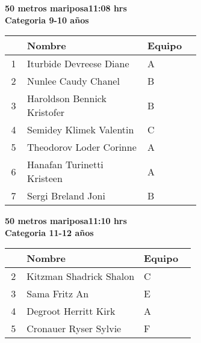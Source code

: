 \begin{minipage}{0.95\linewidth}\vspace{0.5cm} 
\begin{flushleft}
\textbf{
\hspace{-0.15cm}50 metros mariposa\hspace{1.5cm}11:08 hrs \\Categoria 9-10 años}\vspace{-0.2cm} 
\end{flushleft}
\begin{tabular}{cp{0.63\linewidth}l}
\hline
& \textbf{Nombre} & \textbf{Equipo} \\ \hline
1 & Iturbide Devreese Diane & A \\ 
2 & Nunlee Caudy Chanel & B \\ 
3 & Haroldson Bennick Kristofer & B \\ 
4 & Semidey Klimek Valentin & C \\ 
5 & Theodorov Loder Corinne & A \\ 
6 & Hanafan Turinetti Kristeen & A \\ 
7 & Sergi Breland Joni & B \\ 
\end{tabular}
\end{minipage}
\begin{minipage}{0.95\linewidth}\vspace{0.5cm} 
\begin{flushleft}
\textbf{
\hspace{-0.15cm}50 metros mariposa\hspace{1.5cm}11:10 hrs \\Categoria 11-12 años}\vspace{-0.2cm} 
\end{flushleft}
\begin{tabular}{cp{0.63\linewidth}l}
\hline
& \textbf{Nombre} & \textbf{Equipo} \\ \hline
2 & Kitzman Shadrick Shalon & C \\ 
3 & Sama Fritz An & E \\ 
4 & Degroot Herritt Kirk & A \\ 
5 & Cronauer Ryser Sylvie & F \\ 
\end{tabular}
\end{minipage}
